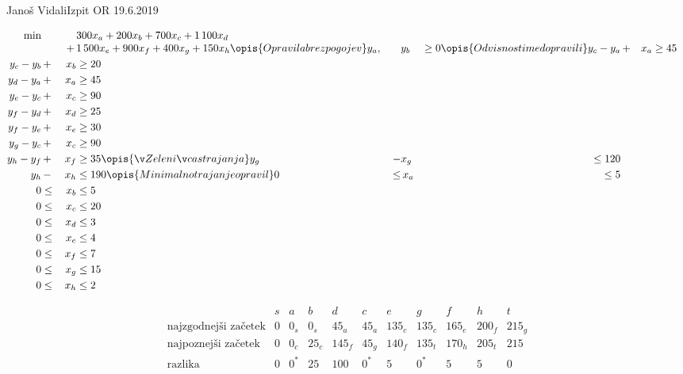 \begin{naloga}{Janoš Vidali}{Izpit OR 19.6.2019}
\begin{odgovor}
\begin{enumerate}[(a)]
\begin{alignat*}{2}
\min &&&{} 300 x_a + 200 x_b + 700 x_c + 1\,100 x_d \\[-1mm]
&&+\,&{} 1\,500 x_e + 900 x_f + 400 x_g + 150 x_h
\opis{Opravila brez pogojev}
y_a, &&{} y_b &\ge 0
\opis{Odvisnosti med opravili}
y_c - y_a &\,+& x_a &\ge 45 \\
y_c - y_b &\,+& x_b &\ge 20 \\
y_d - y_a &\,+& x_a &\ge 45 \\
y_e - y_c &\,+& x_c &\ge 90 \\
y_f - y_d &\,+& x_d &\ge 25 \\
y_f - y_e &\,+& x_e &\ge 30 \\
y_g - y_c &\,+& x_c &\ge 90 \\
y_h - y_f &\,+& x_f &\ge 35
\opis{Želeni čas trajanja}
y_g &\,-& x_g &\le 120 \\
y_h &\,-& x_h &\le 190
\opis{Minimalno trajanje opravil}
0 &\le&\, x_a &\le 5 \\
0 &\le&\, x_b &\le 5 \\
0 &\le&\, x_c &\le 20 \\
0 &\le&\, x_d &\le 3 \\
0 &\le&\, x_e &\le 4 \\
0 &\le&\, x_f &\le 7 \\
0 &\le&\, x_g &\le 15 \\
0 &\le&\, x_h &\le 2
\end{alignat*}
\end{enumerate}
%
\begin{slika}
\pgfslika
{}
\end{slika}
%
\begin{tabela}
$$
\begin{array}{c|cccccccccc}
& s & a & b & d & c & e & g & f & h & t \\ \hline
\text{najzgodnejši začetek} &
0 & 0_s & 0_s & 45_a & 45_a & 135_c & 135_c & 165_e & 200_f & 215_g \\
\text{najpoznejši začetek} &
0 & 0_c & 25_c & 145_f & 45_g & 140_f & 135_t & 170_h & 205_t & 215 \\
\text{razlika} &
0 & 0^* & 25 & 100 & 0^* & 5 & 0^* & 5 & 5 & 0
\end{array}
$$
\end{tabela}
\end{odgovor}
\end{naloga}
